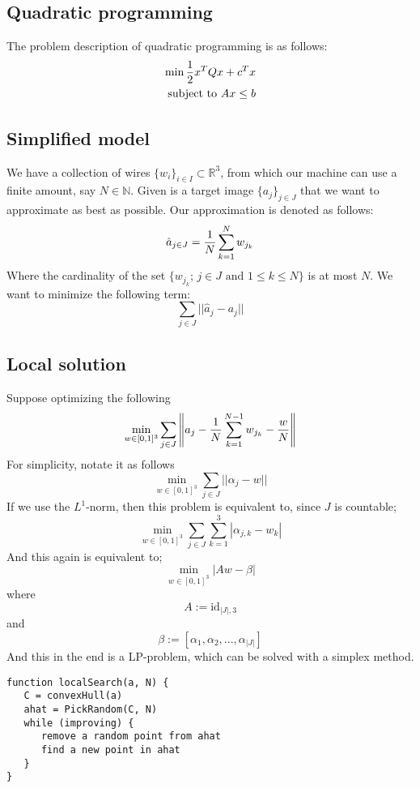 \documentclass[10pt,a4paper]{article}
\newcommand{\R}{\mathbb{R}}
\newcommand{\N}{\mathbb{N}}
\begin{document}
	\subsection*{Quadratic programming}
	The problem description of quadratic programming is as follows:
	\begin{align*}
	\min {1 \over 2} x^T Q x + c^T x\\
	\text{subject to } Ax \leq b
	\end{align*}
	
	\subsection*{Simplified model}
	We have a collection of wires $\{w_i\}_{i \in I} \subset \R^3$, from which our machine can use a finite amount, say $N \in \N$.
	Given is a target image $\{a_j\}_{j \in J}$ that we want to approximate as best as possible.
	Our approximation is denoted as follows:
	\begin{equation}
	\hat{a}_{j \in J} = {1 \over N} \sum_{k=1}^{N} w_{j_k} 
	\end{equation}
	Where the cardinality of the set $\{w_{j_k}; \, j\in J \text{ and } 1 \leq k \leq N \}$ is at most $N$.
	We want to minimize the following term:
	\begin{equation}
	\sum_{j\in J} || \hat{a}_j - a_j || 
	\end{equation}
	
	\subsection*{Local solution}
	Suppose optimizing the following
	\begin{equation*}
	\min_{w \in [0,1]^3} \sum_{j \in J} \left\lVert a_j - {1 \over N} \sum_{k=1}^{N-1} w_{j_k} - {w \over N} \right\rVert
	\end{equation*}
	For simplicity, notate it as follows
	\begin{equation*}
	\min_{w \in [0,1]^3} \sum_{j \in J} ||\alpha_j - w||
	\end{equation*}
	If we use the $L^1$-norm, then this problem is equivalent to, since $J$ is countable;
	\begin{equation*}
	\min_{w \in [0,1]^3} \sum_{j \in J} \sum_{k=1}^{3} |\alpha_{j,k} - w_{k}|
	\end{equation*}
	And this again is equivalent to;
	\begin{equation*}
	\min_{w \in [0,1]^3} |Aw - \beta|
	\end{equation*}
	where 
	\begin{equation}
	A := \text{id}_{|J|,3}
	\end{equation}
	and
	\begin{equation}
	\beta := [\alpha_1, \alpha_2, ..., \alpha_{|J|}]
	\end{equation}
	And this in the end is a LP-problem, which can be solved with a simplex method. 
	\begin{lstlisting}[caption={A algorithm to find a local solution},basicstyle=\small]
function localSearch(a, N) {
   C = convexHull(a)
   ahat = PickRandom(C, N)
   while (improving) {
      remove a random point from ahat
      find a new point in ahat
   }
}
	\end{lstlisting}
	
\end{document}
